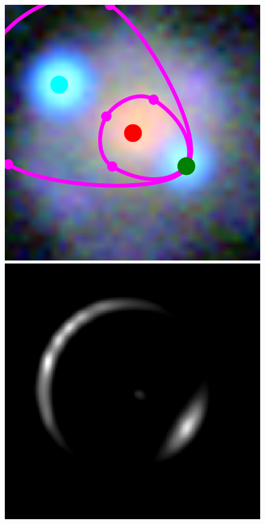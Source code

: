 \documentclass[usenatbib]{mn2e}
\newlength{\myplotswidth}
\begin{document}
\FloatBarrier

\begin{figure}
  \centering
  \includegraphics[width=\myplotswidth]{fig/006941_input}
  \includegraphics[width=\myplotswidth]{fig/006941_arr_time_ipol} \\

\end{figure}
\end{document}
